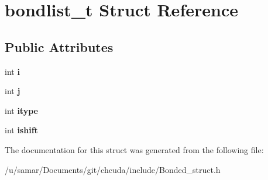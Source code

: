 \hypertarget{structbondlist__t}{}\section{bondlist\+\_\+t Struct Reference}
\label{structbondlist__t}
\subsection*{Public Attributes}
\begin{DoxyCompactItemize}
\item 
\hypertarget{structbondlist__t_a35cbf6d9282245bce2624d0f8414b06f}{}\label{structbondlist__t_a35cbf6d9282245bce2624d0f8414b06f} 
int {\bfseries i}
\item 
\hypertarget{structbondlist__t_a809db368c829cfceb98dce38eb25de4d}{}\label{structbondlist__t_a809db368c829cfceb98dce38eb25de4d} 
int {\bfseries j}
\item 
\hypertarget{structbondlist__t_a0b9ed68d43258693231ea27f160ee2d5}{}\label{structbondlist__t_a0b9ed68d43258693231ea27f160ee2d5} 
int {\bfseries itype}
\item 
\hypertarget{structbondlist__t_ad939ed4045d279d22a1aa4d6ad9ae0ef}{}\label{structbondlist__t_ad939ed4045d279d22a1aa4d6ad9ae0ef} 
int {\bfseries ishift}
\end{DoxyCompactItemize}


The documentation for this struct was generated from the following file\+:\begin{DoxyCompactItemize}
\item 
/u/samar/\+Documents/git/chcuda/include/Bonded\+\_\+struct.\+h\end{DoxyCompactItemize}

